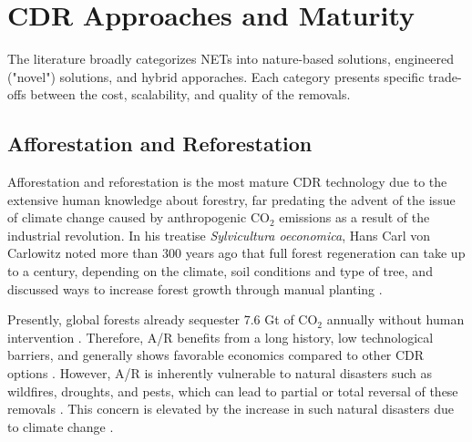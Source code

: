 \section{CDR Approaches and Maturity}
The literature broadly categorizes NETs into nature-based solutions, engineered ("novel") solutions, and hybrid apporaches. Each category presents specific trade-offs between the cost, scalability, and quality of the removals.

\subsection{Afforestation and Reforestation}
Afforestation and reforestation is the most mature CDR technology due to the extensive human knowledge about forestry, far predating the advent of the issue of climate change caused by anthropogenic CO$_2$ emissions as a result of the industrial revolution. In his treatise \textit{Sylvicultura oeconomica}, Hans Carl von Carlowitz noted more than 300 years ago that full forest regeneration can take up to a century, depending on the climate, soil conditions and type of tree, and discussed ways to increase forest growth through manual planting \parencite[pp.~188-201]{von_carlowitz_sylvicultura_1713}.\vspace{2mm}

Presently, global forests already sequester 7.6 Gt of CO$_2$ annually without human intervention \parencite{harris_global_2021}. Therefore, A/R benefits from a long history, low technological barriers, and generally shows favorable economics compared to other CDR options \parencite{fuss_negative_2018}. However, A/R is inherently vulnerable to natural disasters such as wildfires, droughts, and pests, which can lead to partial or total reversal of these removals \parencite{wong_can_2003}. This concern is elevated by the increase in such natural disasters due to climate change \parencite{liang_climate_2025}.\vspace{2mm}

